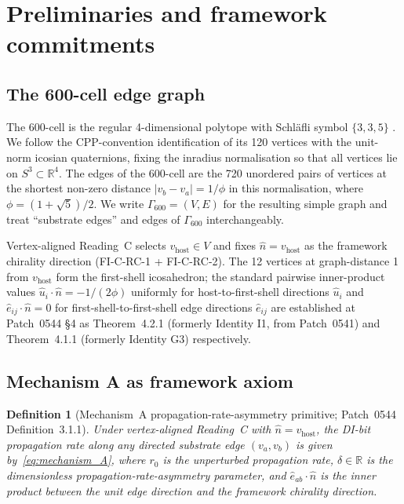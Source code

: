 \documentclass[11pt,letterpaper]{article}
\newtheorem{definition}[theorem]{Definition}
\newcommand{\nhat}{\hat{n}}
\newcommand{\vhost}{v_{\text{host}}}
\newcommand{\Gsixcell}{\Gamma_{600}}
\begin{document}
\section{Preliminaries and framework commitments}\label{sec:preliminaries}

\subsection{The 600-cell edge graph}\label{sec:six_hundred_cell}

The 600-cell is the regular 4-dimensional polytope with Schl{\"a}fli symbol $\{3,3,5\}$ \cite{coxeter1973}. We follow the CPP-convention identification of its 120 vertices with the unit-norm icosian quaternions, fixing the inradius normalisation so that all vertices lie on $S^3 \subset \mathbb{R}^4$. The edges of the 600-cell are the 720 unordered pairs of vertices at the shortest non-zero distance $|v_b - v_a| = 1/\phi$ in this normalisation, where $\phi = (1+\sqrt{5})/2$. We write $\Gsixcell = (V, E)$ for the resulting simple graph and treat ``substrate edges'' and edges of $\Gsixcell$ interchangeably.

Vertex-aligned Reading~C selects $\vhost \in V$ and fixes $\nhat = \vhost$ as the framework chirality direction (FI-C-RC-1 + FI-C-RC-2). The 12 vertices at graph-distance 1 from $\vhost$ form the first-shell icosahedron; the standard pairwise inner-product values $\hat{u}_i\cdot\nhat = -1/(2\phi)$ uniformly for host-to-first-shell directions $\hat{u}_i$ and $\hat{e}_{ij}\cdot\nhat = 0$ for first-shell-to-first-shell edge directions $\hat{e}_{ij}$ are established at Patch~0544 \S4 as Theorem~4.2.1 (formerly Identity I1, from Patch~0541) and Theorem~4.1.1 (formerly Identity G3) respectively.

\subsection{Mechanism A as framework axiom}\label{sec:mechanism_A_as_axiom}

\begin{definition}[Mechanism~A propagation-rate-asymmetry primitive; Patch~0544 Definition~3.1.1]\label{def:mechanism_A}
Under vertex-aligned Reading~C with $\nhat = \vhost$, the DI-bit propagation rate along any directed substrate edge $(v_a, v_b)$ is given by~\eqref{eq:mechanism_A}, where $r_0$ is the unperturbed propagation rate, $\delta \in \mathbb{R}$ is the dimensionless propagation-rate-asymmetry parameter, and $\hat{e}_{ab}\cdot\nhat$ is the inner product between the unit edge direction and the framework chirality direction.
\end{definition}
\end{document}
